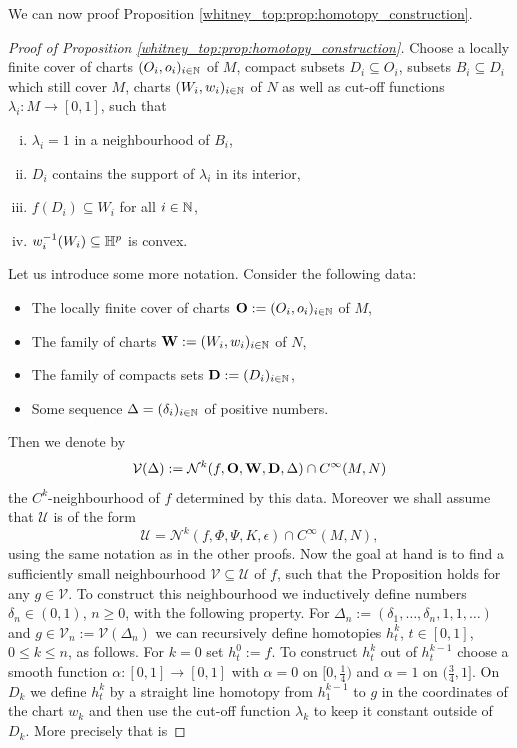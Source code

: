 We can now proof Proposition \ref{whitney_top:prop:homotopy_construction}.

\begin{proof}[Proof of Proposition \ref{whitney_top:prop:homotopy_construction}]
    Choose a locally finite cover of charts $(O_i,o_i)_{i\in \mathbb{N}}$ of $M$, compact subsets $D_i \subseteq O_i$, subsets $B_i \subseteq D_i$ which still cover $M$, charts $(W_i,w_i)_{i\in \mathbb{N}}$ of $N$ as well as cut-off functions $\lambda_i \colon M \to [0,1]$, such that 
    \begin{enumerate}[(i)]
        \item $\lambda_i = 1$ in a neighbourhood of $B_i$,
        \item $D_i$ contains the support of $\lambda_i$ in its interior,
        \item $f(D_i) \subseteq W_i$ for all $i \in \mathbb{N}$,
        \item $w_i^{-1}(W_i) \subseteq \mathbb{H}^p$ is convex.
    \end{enumerate}
    Let us introduce some more notation. Consider the following data:
    \begin{itemize}
        \item The locally finite cover of charts ${\bf{O}} := (O_i,o_i)_{i \in \mathbb{N}}$ of $M$,
        \item The family of charts ${\bf{W}} := (W_i,w_i)_{i \in \mathbb{N}}$ of $N$,
        \item The family of compacts sets ${\bf{D}} := (D_i)_{i \in \mathbb{N}}$,
        \item Some sequence $\Delta = (\delta_i)_{i \in \mathbb{N}}$ of positive numbers.
    \end{itemize}
    Then we denote by 
    \[
    \mathcal{V}({\Delta}) := \mathcal{N}^k(f,{\bf O},{\bf W} ,{\bf D},{\Delta}) \cap C^\infty(M,N)
    \]
    the $C^k$-neighbourhood of $f$ determined by this data. Moreover we shall assume that $\mathcal{U}$ is of the form 
    \[
    \mathcal{U} = \mathcal{N}^k(f,\Phi,\Psi,K,\epsilon) \cap C^\infty(M,N),
    \]
    using the same notation as in the other proofs. Now the goal at hand is to find a sufficiently small neighbourhood $\mathcal{V} \subseteq \mathcal{U}$ of $f$, such that the Proposition holds for any $g \in \mathcal{V}$. To construct this neighbourhood we inductively define numbers $\delta_n \in (0,1)$, $n \geq 0$, with the following property. For $\Delta_n := (\delta_1,\ldots,\delta_n,1,1,\ldots)$ and $g \in \mathcal{V}_n := \mathcal{V}(\Delta_n)$ we can recursively define homotopies $h^k_t$, $t \in [0,1]$, $0 \leq k \leq n$, as follows. For $k = 0$ set $h_t^0 := f$. To construct $h_t^k$ out of $h_t^{k-1}$ choose a smooth function $\alpha \colon [0,1] \to [0,1]$ with $\alpha = 0$ on $[0,\frac{1}{4})$ and $\alpha = 1$ on $(\frac{3}{4},1]$. On $D_k$ we define $h_t^k$ by a straight line homotopy from $h_1^{k-1}$ to $g$ in the coordinates of the chart $w_k$ and then use the cut-off function $\lambda_k$ to keep it constant outside of $D_k$. More precisely that is 

\end{proof}
